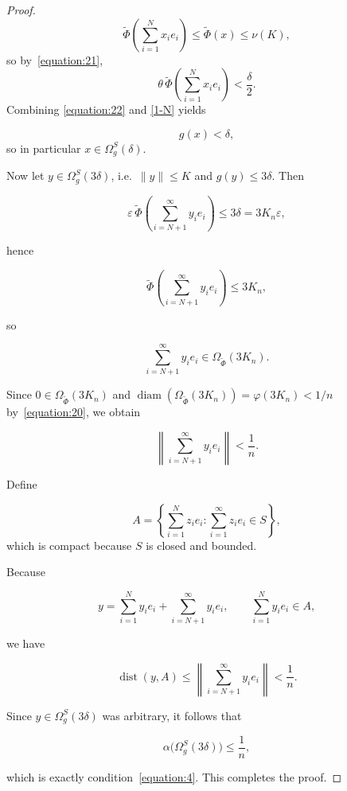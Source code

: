 \documentclass[12pt]{article}
\theoremstyle{thmstyleone}%
\theoremstyle{thmstyletwo}%
\theoremstyle{thmstylethree}%
\begin{document}
{{{\begin{proof}
\[ \widetilde{\Phi}\!\left(\sum_{i=1}^N x_i e_i\right)
        \le \widetilde{\Phi}(x)
        \le \nu(K),
    \]
    so by~\eqref{equation:21},
    \begin{equation}\label{1-N}
        \theta\,\widetilde{\Phi}\!\left(\sum_{i=1}^N x_i e_i\right)
        <\frac{\delta}{2}.
    \end{equation}
    Combining \eqref{equation:22} and \eqref{1-N} yields
    

\[ g(x)<\delta,
\]
    so in particular \(x\in\Omega_g^S(\delta)\).

    Now let $y\in\Omega_g^S(3\delta)$, i.e.\ $\|y\|\le K$ and $g(y)\le 3\delta$.  
    Then
    

\[
        \varepsilon\,\widetilde{\Phi}\!\left(\sum_{i=N+1}^\infty y_i e_i\right)
        \le 3\delta
        =3K_n\varepsilon,
    \]


    hence
    

\[
        \widetilde{\Phi}\!\left(\sum_{i=N+1}^\infty y_i e_i\right)
        \le 3K_n,
    \]


    so
    

\[
        \sum_{i=N+1}^\infty y_i e_i \in \Omega_{\widetilde{\Phi}}(3K_n).
    \]


    Since $0\in\Omega_{\widetilde{\Phi}}(3K_n)$ and $\operatorname{diam}(\Omega_{\widetilde{\Phi}}(3K_n))=\varphi(3K_n)<1/n$ by~\eqref{equation:20}, we obtain
    

\[
        \left\|\sum_{i=N+1}^\infty y_i e_i\right\|<\frac{1}{n}.
    \]



    Define
    

\[
        A=\left\{\sum_{i=1}^N z_i e_i : \sum_{i=1}^\infty z_i e_i\in S\right\},
    \]
 which is compact because $S$ is closed and bounded.
  
    Because
    

\[
        y=\sum_{i=1}^N y_i e_i+\sum_{i=N+1}^\infty y_i e_i,
        \qquad
        \sum_{i=1}^N y_i e_i\in A,
    \]


    we have
    

\[
        \operatorname{dist}(y,A)
        \le \left\|\sum_{i=N+1}^\infty y_i e_i\right\|
        <\frac{1}{n}.
    \]



    Since $y\in\Omega_g^S(3\delta)$ was arbitrary, it follows that
    

\[
        \alpha\bigl(\Omega_g^S(3\delta)\bigr)\le \frac{1}{n},
    \]


    which is exactly condition~\eqref{equation:4}.  
    This completes the proof.
\end{proof}

}}}
\end{document}
